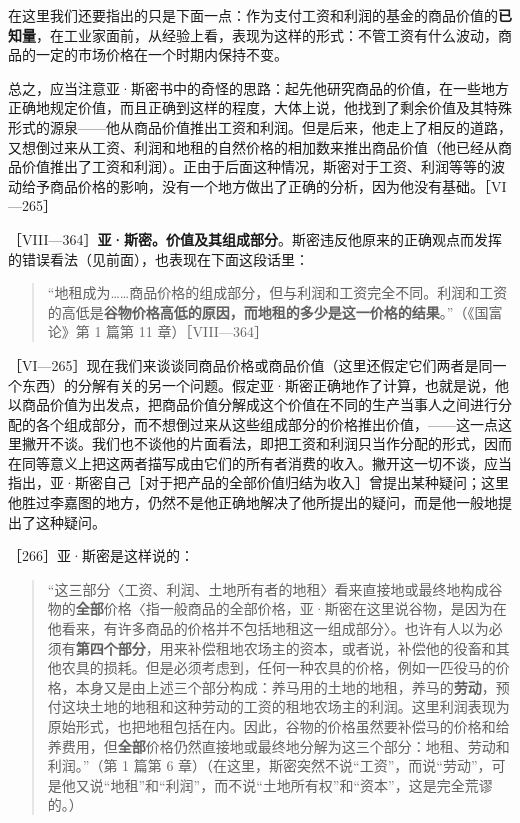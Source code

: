 在这里我们还要指出的只是下面一点：作为支付工资和利润的基金的商品价值的\textbf{已知量}，在工业家面前，从经验上看，表现为这样的形式：不管工资有什么波动，商品的一定的市场价格在一个时期内保持不变。

总之，应当注意亚·斯密书中的奇怪的思路：起先他研究商品的价值，在一些地方正确地规定价值，而且正确到这样的程度，大体上说，他找到了剩余价值及其特殊形式的源泉——他从商品价值推出工资和利润。但是后来，他走上了相反的道路，又想倒过来从工资、利润和地租的自然价格的相加数来推出商品价值（他已经从商品价值推出了工资和利润）。正由于后面这种情况，斯密对于工资、利润等等的波动给予商品价格的影响，没有一个地方做出了正确的分析，因为他没有基础。［VI—265］


［VIII—364］\fontbox{~\{}\textbf{亚·斯密。价值及其组成部分}。斯密违反他原来的正确观点而发挥的错误看法（见前面），也表现在下面这段话里：

\begin{quote}“地租成为……商品价格的组成部分，但与利润和工资完全不同。利润和工资的高低是\textbf{谷物价格高低的原因，而地租的多少是这一价格的结果}。”（《国富论》第 1 篇第 11 章）\fontbox{\}~}［VIII—364］\end{quote}


［VI—265］现在我们来谈谈同商品价格或商品价值（这里还假定它们两者是同一个东西）的分解有关的另一个问题。假定亚·斯密正确地作了计算，也就是说，他以商品价值为出发点，把商品价值分解成这个价值在不同的生产当事人之间进行分配的各个组成部分，而不想倒过来从这些组成部分的价格推出价值，——这一点这里撇开不谈。我们也不谈他的片面看法，即把工资和利润只当作分配的形式，因而在同等意义上把这两者描写成由它们的所有者消费的收入。撇开这一切不谈，应当指出，亚·斯密自己［对于把产品的全部价值归结为收入］曾提出某种疑问；这里他胜过李嘉图的地方，仍然不是他正确地解决了他所提出的疑问，而是他一般地提出了这种疑问。

［266］亚·斯密是这样说的：

\begin{quote}“这三部分〈工资、利润、土地所有者的地租〉看来直接地或最终地构成谷物的\textbf{全部}价格〈指一般商品的全部价格，亚·斯密在这里说谷物，是因为在他看来，有许多商品的价格并不包括地租这一组成部分〉。也许有人以为必须有\textbf{第四个部分}，用来补偿租地农场主的资本，或者说，补偿他的役畜和其他农具的损耗。但是必须考虑到，任何一种农具的价格，例如一匹役马的价格，本身又是由上述三个部分构成：养马用的土地的地租，养马的\textbf{劳动}，预付这块土地的地租和这种劳动的工资的租地农场主的利润。\fontbox{~\{}这里利润表现为原始形式，也把地租包括在内。\fontbox{\}~}因此，谷物的价格虽然要补偿马的价格和给养费用，但\textbf{全部}价格仍然直接地或最终地分解为这三个部分：地租、劳动和利润。”（第 1 篇第 6 章）（在这里，斯密突然不说“工资”，而说“劳动”，可是他又说“地租”和“利润”，而不说“土地所有权”和“资本”，这是完全荒谬的。）\end{quote}

